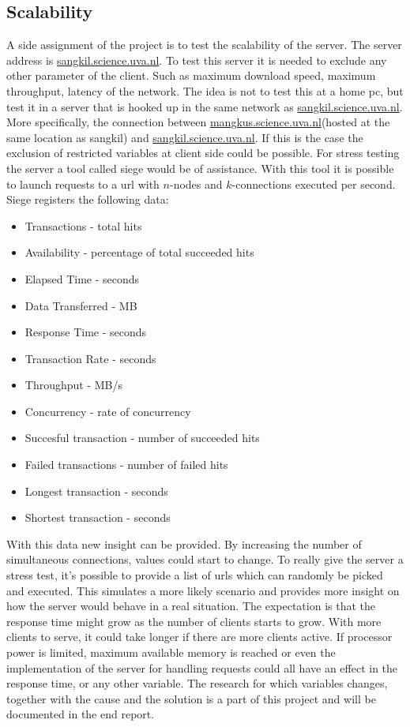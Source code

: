 \subsection{Scalability}
A side assignment of the project is to test the scalability of the server. The server address is \url{sangkil.science.uva.nl}. To test this server it is needed to exclude any other parameter of the client. Such as maximum download speed, maximum throughput, latency of the network. The idea is not to test this at a home pc, but test it in a server that is hooked up in the same network as \url{sangkil.science.uva.nl}. More specifically, the connection between \url{mangkus.science.uva.nl}(hosted at the same location as sangkil) and \url{sangkil.science.uva.nl}. If this is the case the exclusion of restricted variables at client side could be possible. 
For stress testing the server a tool called siege \cite{Siege} would be of assistance. With this tool it is possible to launch requests to a url with $n$-nodes and $k$-connections executed per second. Siege registers the following data:
\begin{itemize}
\item Transactions - total hits
\item Availability - percentage of total succeeded hits
\item Elapsed Time - seconds
\item Data Transferred - MB
\item Response Time - seconds
\item Transaction Rate - seconds 
\item Throughput - MB/s
\item Concurrency - rate of concurrency
\item Succesful transaction - number of succeeded hits
\item Failed transactions - number of failed hits
\item Longest transaction - seconds
\item Shortest transaction - seconds
\end{itemize}
With this data new insight can be provided. By increasing the number of simultaneous connections, values could start to change. To really give the server a stress test, it's possible to provide a list of urls which can randomly be picked and executed. This simulates a more likely scenario and provides more insight on how the server would behave in a real situation. The expectation is that the response time might grow as the number of clients starts to grow. With more clients to serve, it could take longer if there are more clients active. If processor power is limited, maximum available memory is reached or even the implementation of the server for handling requests could all have an effect in the response time, or any other variable. The research for which variables changes, together with the cause and the solution is a part of this project and will be documented in the end report. 


